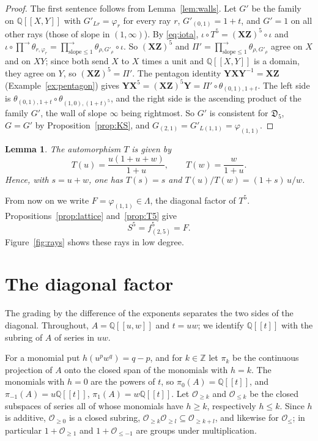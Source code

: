 \documentclass[11pt]{article}
\newtheorem{lemma}[theorem]{Lemma}
\theoremstyle{definition}
\theoremstyle{remark}
\numberwithin{equation}{section}
\newcommand{\Q}{\mathbb{Q}}
\newcommand{\ps}[1]{\Q[\![#1]\!]}
\newcommand{\Oge}[1]{\mathcal{O}_{\geq #1}}
\newcommand{\Ole}[1]{\mathcal{O}_{\leq #1}}
\newcommand{\asc}{\textstyle\prod^{\rightarrow}}
\newcommand{\bX}{\mathbf{X}}
\newcommand{\bY}{\mathbf{Y}}
\newcommand{\bZ}{\mathbf{Z}}
\begin{document}
\begin{proof}
The first sentence follows from Lemma~\ref{lem:walls}. Let $G'$ be the
family on $\ps{X,Y}$ with $G'_{Lr}=\varphi_r$ for every ray $r$,
$G'_{(0,1)}=1+t$, and $G'=1$ on all other rays (those of slope in
$(1,\infty)$). By \eqref{eq:iota},
$\iota\circ T^5=(\bX\bZ)^5\circ\iota$ and
$\iota\circ\asc\theta_{r,\varphi_r}=\asc_{\text{slope}\leq1}\theta_{\rho,G'_\rho}\circ\iota$.
So $(\bX\bZ)^5$ and $\Pi'=\asc_{\text{slope}\leq1}\theta_{\rho,G'_\rho}$
agree on $X$ and on $XY$; since both send $X$ to $X$ times a unit and
$\ps{X,Y}$ is a domain, they agree on $Y$, so $(\bX\bZ)^5=\Pi'$. The
pentagon identity $\bY\bX\bY^{-1}=\bX\bZ$ (Example~\ref{ex:pentagon})
gives $\bY\bX^5=(\bX\bZ)^5\bY=\Pi'\circ\theta_{(0,1),1+t}$. The left side
is $\theta_{(0,1),1+t}\circ\theta_{(1,0),(1+t)^5}$, and the right side is
the ascending product of the family $G'$, the wall of slope $\infty$
being rightmost. So $G'$ is consistent for $\mathfrak{D}_5$, $G=G'$ by
Proposition~\ref{prop:KS}, and $G_{(2,1)}=G'_{L(1,1)}=\varphi_{(1,1)}$.
\end{proof}

\begin{lemma}\label{lem:Texplicit}
The automorphism $T$ is given by
\[
  T(u)=\frac{u(1+u+w)}{1+u},\qquad T(w)=\frac{w}{1+u}.
\]
Hence, with $s=u+w$, one has $T(s)=s$ and $T(u)/T(w)=(1+s)\,u/w$.
\end{lemma}



From now on we write $F=\varphi_{(1,1)}\in\Lambda$, the diagonal factor
of $T^5$. Propositions~\ref{prop:lattice} and~\ref{prop:T5} give
\begin{equation}\label{eq:SF}
  S^5=f_{(2,5)}^5=F .
\end{equation}
Figure~\ref{fig:rays} shows these rays in low degree.



\section{The diagonal factor}\label{sec:filtration}

The grading by the difference of the exponents separates the two sides of
the diagonal.
Throughout, $A=\ps{u,w}$ and $t=uw$; we identify $\ps{t}$ with the
subring of $A$ of series in $uw$.

For a monomial put $h(u^pw^q)=q-p$, and for $k\in\mathbb{Z}$ let $\pi_k$
be the continuous projection of $A$ onto the closed span of the monomials
with $h=k$. The monomials with $h=0$ are the powers of $t$, so
$\pi_0(A)=\ps{t}$, and $\pi_{-1}(A)=u\ps{t}$, $\pi_1(A)=w\ps{t}$. Let
$\Oge{k}$ and $\Ole{k}$ be the closed subspaces of series all of whose
monomials have $h\geq k$, respectively $h\leq k$. Since $h$ is additive,
$\Oge0$ is a closed subring, $\Oge{k}\Oge{l}\subseteq\Oge{k+l}$, and
likewise for $\Ole{}$; in particular $1+\Oge1$ and $1+\Ole{-1}$ are
groups under multiplication.
\end{document}
